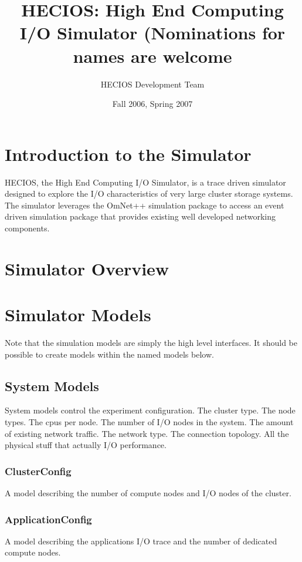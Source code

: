 \documentclass[11pt]{article}
\title{HECIOS: High End Computing I/O Simulator (Nominations for names are welcome}
\author{HECIOS Development Team}
\date{Fall 2006, Spring 2007}
\begin{document}
\maketitle

\newpage

\setcounter{tocdepth}{2}
\tableofcontents

%
%
\setlength{\parindent}{0pt}
\setlength{\parskip}{11pt}

%
%
\section{Introduction to the Simulator}
HECIOS, the High End Computing I/O Simulator, is a trace driven simulator
designed to explore the I/O characteristics of very large cluster storage
systems.  The simulator leverages the OmNet++ simulation package to access an
event driven simulation package that provides existing well developed
networking components.

\section{Simulator Overview}

\section{Simulator Models}
Note that the simulation models are simply the high level interfaces.  It
should be possible to create models within the named models below.

\subsection{System Models}
System models control the experiment configuration.  The cluster type.  The
node types.  The cpus per node.  The number of I/O nodes in the system.  The amount
of existing network traffic.  The network type.  The connection topology.  All
the physical stuff that actually I/O performance.

\subsubsection{ClusterConfig}
A model describing the number of compute nodes and I/O nodes of the cluster.

\subsubsection{ApplicationConfig}
A model describing the applications I/O trace and the number of dedicated
compute nodes.
\end{document}
